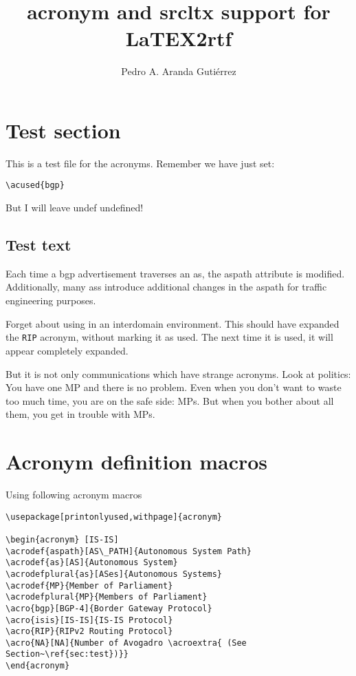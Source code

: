 \documentclass[a4paper,11pt]{article}
\title{acronym and srcltx support for LaTEX2rtf}
\author{Pedro A. Aranda Guti\'errez}
\begin{document}
\maketitle
{}
\section{Test section}
This is a test file for the acronyms. Remember we have just set:
\begin{verbatim}
\acused{bgp}
\end{verbatim}
But I will leave \ac{undef} undefined!

\subsection{Test text}
\label{sec:test}

Each time a \ac{bgp} advertisement traverses an \ac{as}, the \ac{aspath}
attribute is modified. Additionally, many \acp{as} introduce additional
changes in the \ac{aspath} for traffic engineering purposes.

Forget about using  in an interdomain environment. This
should have expanded the \texttt{RIP} acronym, without marking it as
used. The next time it is used, it will appear completely expanded.

But it is not only communications which have strange acronyms. Look at
politics: You have one \ac{MP} and there is no problem. Even when you
don't want to waste too much time, you are on the safe side: \acp{MP}.
But when you bother about all them, you get in trouble with \aclp{MP}.

\section{Acronym definition macros}

Using following acronym macros

\begin{verbatim}
\usepackage[printonlyused,withpage]{acronym}

\begin{acronym} [IS-IS]
\acrodef{aspath}[AS\_PATH]{Autonomous System Path}
\acrodef{as}[AS]{Autonomous System}
\acrodefplural{as}[ASes]{Autonomous Systems}
\acrodef{MP}{Member of Parliament}
\acrodefplural{MP}{Members of Parliament}
\acro{bgp}[BGP-4]{Border Gateway Protocol}
\acro{isis}[IS-IS]{IS-IS Protocol}
\acro{RIP}{RIPv2 Routing Protocol}
\acro{NA}[NA]{Number of Avogadro \acroextra{ (See Section~\ref{sec:test})}}
\end{acronym}
\end{verbatim}
\end{document}
